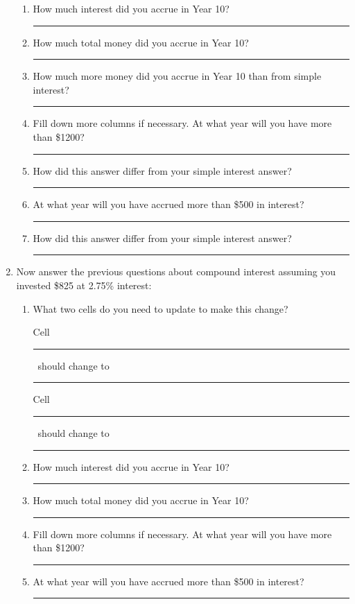 \documentclass[12pt]{article}
\newcommand{\ans}[1][1in]{\rule{#1}{.5pt}}
\newcommand{\be}{\begin{enumerate}}
\newcommand{\ee}{\end{enumerate}}
\begin{document}
\begin{enumerate}
\be
\item How much interest did you accrue in Year 10? \ans
\item How much total money did you accrue in Year 10? \ans
\item How much more money did you accrue in Year 10 than from simple interest? \ans
\item Fill down more columns if necessary. At what year will you have more than \$1200? \ans
\item How did this answer differ from your simple interest answer? \ans
\item At what year will you have accrued more than \$500 in interest? \ans
\item How did this answer differ from your simple interest answer? \ans


\ee

\item Now answer the previous questions about compound interest assuming you invested \$825 at 2.75\% interest:
\be
\item What two cells do you need to update to make this change?

Cell  \ans\ should change to \ans

 Cell \ans\ should change to \ans


\item How much interest did you accrue in Year 10? \ans
\item How much total money did you accrue in Year 10? \ans
\item Fill down more columns if necessary. At what year will you have more than \$1200? \ans
\item At what year will you have accrued more than \$500 in interest? \ans

\ee
 
 \ee
\end{document}
